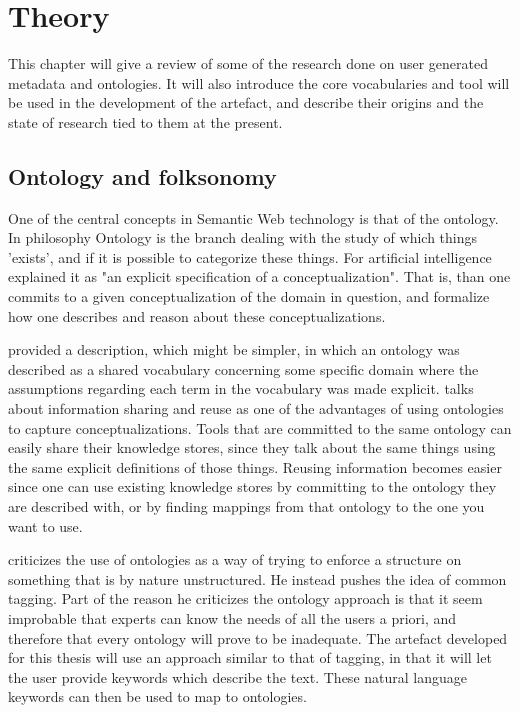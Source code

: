 
\chapter{Theory} %
\label{Theory} %

This chapter will give a review of some of the research done on user generated metadata and ontologies.
It will also introduce the core vocabularies and tool will be used in the development of the artefact,
and describe their origins and the state of research tied to them at the present.

\section{Ontology and folksonomy}
One of the central concepts in Semantic Web technology is that of the ontology.
In philosophy Ontology is the branch dealing with the study of which things 'exists', and if it is possible to categorize these things.
For artificial intelligence \citet{Gruber1993} explained it as "an explicit specification of a conceptualization".
That is, than one commits to a given conceptualization of the domain in question,
and formalize how one describes and reason about these conceptualizations.

\citet{Guarino1998} provided a description, which might be simpler, in which an ontology was described as a shared vocabulary
concerning some specific domain where the assumptions regarding each term in the vocabulary was made explicit.
\citet{Pretorius2004} talks about information sharing and reuse as one of the advantages of using ontologies to
capture conceptualizations.
Tools that are committed to the same ontology can easily share their knowledge stores,
since they talk about the same things using the same explicit definitions of those things.
Reusing information becomes easier since one can use existing knowledge stores by committing to the ontology they are
described with, or by finding mappings from that ontology to the one you want to use.


\citet{Shirky2007} criticizes the use of ontologies as a way of trying to enforce a structure on something that is by nature unstructured.
He instead pushes the idea of common tagging.
Part of the reason he criticizes the ontology approach is that it seem improbable that experts can know the needs of all the users a priori,
and therefore that every ontology will prove to be inadequate.
The artefact developed for this thesis will use an approach similar to that of tagging,
in that it will let the user provide keywords which describe the text.
These natural language keywords can then be used to map to ontologies.

